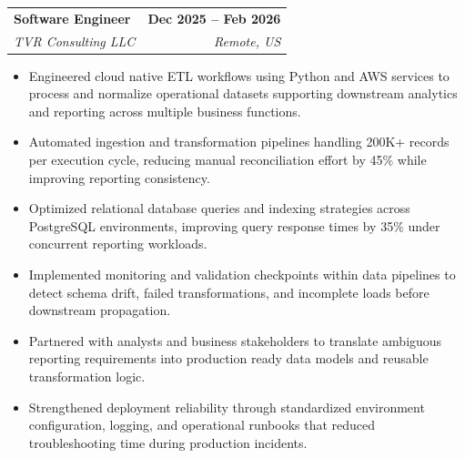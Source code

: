 \documentclass[letterpaper,10pt]{article}
\makeatletter
\newcommand{\resumeItem}[1]{
  \item\small{#1}\vspace{-2pt}
}
\newcommand{\resumeSubheading}[4]{
  \vspace{-1pt}\item
    \begin{tabular*}{1.0\textwidth}[t]{l@{\extracolsep{\fill}}r}
      \textbf{#1} & \textbf{\small #2} \\
      \textit{\small#3} & \textit{\small #4} \\
    \end{tabular*}\vspace{-7pt}
}
\newcommand{\resumeItemListStart}{\begin{itemize}[leftmargin=0.15in]}
\newcommand{\resumeItemListEnd}{\end{itemize}\vspace{-5pt}}
\makeatother
\begin{document}
    \resumeSubheading
      {Software Engineer}{Dec 2025 -- Feb 2026}
      {TVR Consulting LLC}{Remote, US}
      \resumeItemListStart
        \resumeItem{Engineered cloud native ETL workflows using Python and AWS services to process and normalize operational datasets supporting downstream analytics and reporting across multiple business functions.}
        \resumeItem{Automated ingestion and transformation pipelines handling 200K+ records per execution cycle, reducing manual reconciliation effort by 45\% while improving reporting consistency.}
        \resumeItem{Optimized relational database queries and indexing strategies across PostgreSQL environments, improving query response times by 35\% under concurrent reporting workloads.}
        \resumeItem{Implemented monitoring and validation checkpoints within data pipelines to detect schema drift, failed transformations, and incomplete loads before downstream propagation.}
        \resumeItem{Partnered with analysts and business stakeholders to translate ambiguous reporting requirements into production ready data models and reusable transformation logic.}
        \resumeItem{Strengthened deployment reliability through standardized environment configuration, logging, and operational runbooks that reduced troubleshooting time during production incidents.}
      \resumeItemListEnd
\end{document}
